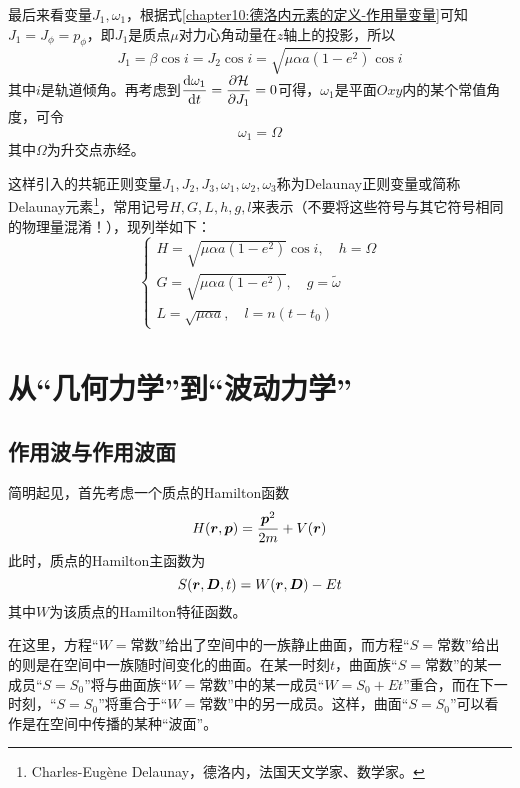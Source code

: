 最后来看变量$J_1, \omega_1$，根据式\eqref{chapter10:德洛内元素的定义-作用量变量}可知$J_1=J_\phi=p_\phi$，即$J_1$是质点$\mu$对力心角动量在$z$轴上的投影，所以
\begin{equation}
	J_1 = \beta\cos i = J_2\cos i = \sqrt{\mu\alpha a(1-e^2)}\cos i
\end{equation}
其中$i$是轨道倾角。再考虑到$\dfrac{\mathrm{d} \omega_1}{\mathrm{d} t} = \dfrac{\partial \mathcal{H}}{\partial J_1} = 0$可得，$\omega_1$是平面$Oxy$内的某个常值角度，可令
\begin{equation}
	\omega_1 = \varOmega
\end{equation}
其中$\varOmega$为升交点赤经。

这样引入的共轭正则变量$J_1,J_2,J_3,\omega_1,\omega_2,\omega_3$称为Delaunay正则变量或简称Delaunay元素\footnote{Charles-Eugène Delaunay，德洛内，法国天文学家、数学家。}，常用记号$H,G,L,h,g,l$来表示（不要将这些符号与其它符号相同的物理量混淆！），现列举如下：
\begin{equation}
\begin{cases}
	H = \sqrt{\mu\alpha a(1-e^2)}\cos i,\quad h=\varOmega \\
	G = \sqrt{\mu\alpha a(1-e^2)},\quad g=\tilde{\omega} \\
	L = \sqrt{\mu\alpha a},\quad l = n(t-t_0)
\end{cases}
\end{equation}

\section{从“几何力学”到“波动力学”}

\subsection{作用波与作用波面}

简明起见，首先考虑一个质点的Hamilton函数
\begin{equation*}
	H(\boldsymbol{r},\boldsymbol{p}) = \frac{\boldsymbol{p}^2}{2m} + V(\boldsymbol{r})
\end{equation*}
此时，质点的Hamilton主函数为
\begin{equation*}
	S(\boldsymbol{r},\boldsymbol{D},t) = W(\boldsymbol{r},\boldsymbol{D}) - Et
\end{equation*}
其中$W$为该质点的Hamilton特征函数。

在这里，方程“$W=\text{常数}$”给出了空间中的一族静止曲面，而方程“$S=\text{常数}$”给出的则是在空间中一族随时间变化的曲面。在某一时刻$t$，曲面族“$S=\text{常数}$”的某一成员“$S=S_0$”将与曲面族“$W=\text{常数}$”中的某一成员“$W=S_0+Et$”重合，而在下一时刻，“$S=S_0$”将重合于“$W=\text{常数}$”中的另一成员。这样，曲面“$S=S_0$”可以看作是在空间中传播的某种“波面”。

